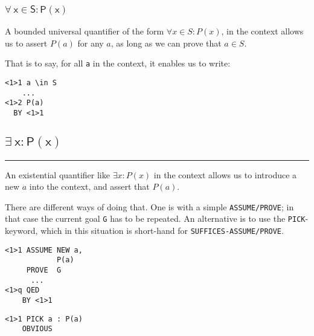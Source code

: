 \documentclass{article}
\newcommand{\code}[1]{\mathsf{#1}}
\begin{document}
\subsubsection{$\code{\forall \ x \in S : P(x)}$}
\vspace{10pt}
\begin{minipage}{230pt}
A bounded universal quantifier of the form $\forall x \in S : P(x)$,
in the context allows us to assert $P(a)$ for 
any $a$, as long as we can prove that $a \in S$.
\vspace{5pt}

That is to say, for all \verb|a| in the context, it enables us to write:
\end{minipage}
%
\hspace{15pt} \vline \hspace{15pt}
%
\begin{minipage}{80pt}
\begin{verbatim}
<1>1 a \in S
    ...
<1>2 P(a)
  BY <1>1
\end{verbatim}
\vspace{5pt}
\end{minipage}


\newpage
\subsection{$\code{\exists\ x : P(x)}$}
\hrule
\vspace{10pt}
\begin{minipage}{230pt}
An existential quantifier like $\exists x : P(x)$ in the context
allows us to introduce a new $a$ into the context, and assert that
$P(a)$.
\vspace{5pt}

There are different ways of doing that. One is with a simple
\verb|ASSUME/PROVE|; in that case the current goal \verb|G| has to be
repeated.  An alternative is to use the \verb|PICK|-keyword, which in
this situation is short-hand for \verb|SUFFICES-ASSUME/PROVE|.

\end{minipage}
%
\hspace{15pt} \vline \hspace{15pt}
%
%
\begin{minipage}{100pt}
\begin{verbatim}
<1>1 ASSUME NEW a,
            P(a)
     PROVE  G
      ...
<1>q QED
    BY <1>1
\end{verbatim}
\end{minipage}
\hspace{0pt} \vline \hspace{10pt}
\begin{minipage}{80pt}
\begin{verbatim}
<1>1 PICK a : P(a)
    OBVIOUS




\end{verbatim}
\end{minipage}
\end{document}

